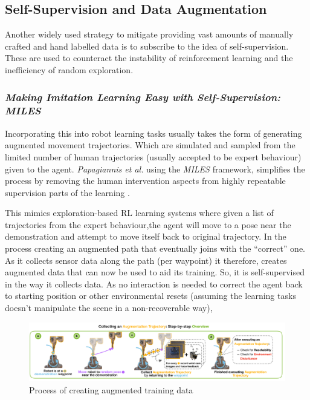 \subsection{Self-Supervision and Data Augmentation}
Another widely used strategy to mitigate providing vast amounts of manually crafted and hand labelled data is to subscribe to the idea of self-supervision. These are used to counteract the instability of reinforcement learning and the inefficiency of random exploration.

\subsubsection{\emph{Making Imitation Learning Easy with Self-Supervision: MILES}}
Incorporating this into robot learning tasks usually takes the form of generating augmented movement trajectories. Which are simulated and sampled from the limited number of human trajectories (usually accepted to be expert behaviour) given to the agent. \emph{Papagiannis et al.} using the \emph{MILES} framework, simplifies the process by removing the human intervention aspects from highly repeatable supervision parts of the learning \cite{papagiannis2024milesmakingimitationlearning}. 

This mimics exploration-based RL learning systems where given a list of trajectories from the expert behaviour,the agent will move to a pose near the demonstration and attempt to move itself back to original trajectory. In the process creating an augmented path that eventually joins with the ``correct'' one. As it collects sensor data along the path (per waypoint) it therefore, creates augmented data that can now be used to aid its training. So, it is self-supervised in the way it collects data. As no interaction is needed to correct the agent back to starting position or other environmental resets (assuming the learning tasks doesn't manipulate the scene in a non-recoverable way),

\begin{figure}[h]
  \centering
  \includegraphics[width=0.7\linewidth]{assets/rel-work/augmentation-miles.png}
  \caption{Process of creating augmented training data \cite{papagiannis2024milesmakingimitationlearning}}\label{fig:aug-miles}
\end{figure}

